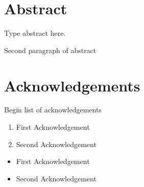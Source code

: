 \documentclass{article}
\begin{document}

\newpage %
\setcounter{page}{1} %

\section*{Abstract} %

\noindent Type abstract here. %
\par Second paragraph of abstract %

\newpage %
\section*{Acknowledgements} %

\noindent Begin list of acknowledgements
\begin{enumerate} %
    \item First Acknowledgement %
    \item Second Acknowledgement %
\end{enumerate}


\begin{itemize} %
    \item First Acknowledgement %
    \item Second Acknowledgement %
\end{itemize}

\newpage %
\tableofcontents %
\listoftables %
\listoffigures %
\end{document}
